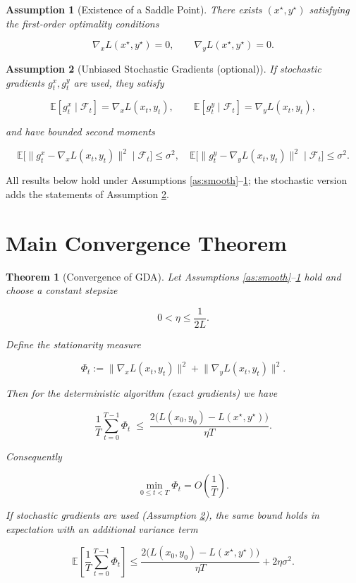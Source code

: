 \documentclass{article}
\newtheorem{assumption}{Assumption}
\newtheorem{theorem}{Theorem}
\begin{document}
\begin{assumption}[Existence of a Saddle Point]\label{as:saddle}
There exists \((x^\star,y^\star)\) satisfying the first‑order optimality conditions  

\[
\nabla_x L(x^\star,y^\star)=0,\qquad \nabla_y L(x^\star,y^\star)=0 .
\]
\end{assumption}

\begin{assumption}[Unbiased Stochastic Gradients (optional)]\label{as:unbiased}
If stochastic gradients \(g^x_t,g^y_t\) are used, they satisfy  

\[
\mathbb{E}[g^x_t\mid \mathcal{F}_t]=\nabla_x L(x_t,y_t),\qquad
\mathbb{E}[g^y_t\mid \mathcal{F}_t]=\nabla_y L(x_t,y_t),
\]

and have bounded second moments  

\[
\mathbb{E}\big[\|g^x_t-\nabla_x L(x_t,y_t)\|^2\mid\mathcal{F}_t\big]\le\sigma^2,\quad
\mathbb{E}\big[\|g^y_t-\nabla_y L(x_t,y_t)\|^2\mid\mathcal{F}_t\big]\le\sigma^2 .
\]
\end{assumption}

All results below hold under Assumptions \ref{as:smooth}–\ref{as:saddle}; the stochastic version adds the statements of Assumption \ref{as:unbiased}.

\section*{Main Convergence Theorem}
\begin{theorem}[Convergence of GDA]\label{thm:main}
Let Assumptions \ref{as:smooth}–\ref{as:saddle} hold and choose a constant stepsize  

\[
0<\eta\le\frac{1}{2L}.
\]

Define the \emph{stationarity measure}  

\[
\Phi_t:=\big\|\nabla_x L(x_t,y_t)\big\|^2+\big\|\nabla_y L(x_t,y_t)\big\|^2 .
\]

Then for the deterministic algorithm (exact gradients) we have  

\[
\frac{1}{T}\sum_{t=0}^{T-1}\Phi_t
\;\le\;
\frac{2\big(L(x_0,y_0)-L(x^\star,y^\star)\big)}{\eta T}.
\tag{2}
\]

Consequently  

\[
\min_{0\le t<T}\Phi_t = O\!\left(\frac{1}{T}\right).
\]

If stochastic gradients are used (Assumption \ref{as:unbiased}), the same bound holds in expectation with an additional variance term  

\[
\mathbb{E}\!\left[\frac{1}{T}\sum_{t=0}^{T-1}\Phi_t\right]
\le
\frac{2\big(L(x_0,y_0)-L(x^\star,y^\star)\big)}{\eta T}
+2\eta\sigma^2 .
\tag{3}
\]
\end{theorem}
\end{document}
